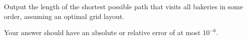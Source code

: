 
  Output the length of the shortest possible path that visits all bakeries in some order, assuming an optimal grid layout.

  Your answer should have an absolute or relative error of at most $10^{-6}$.
